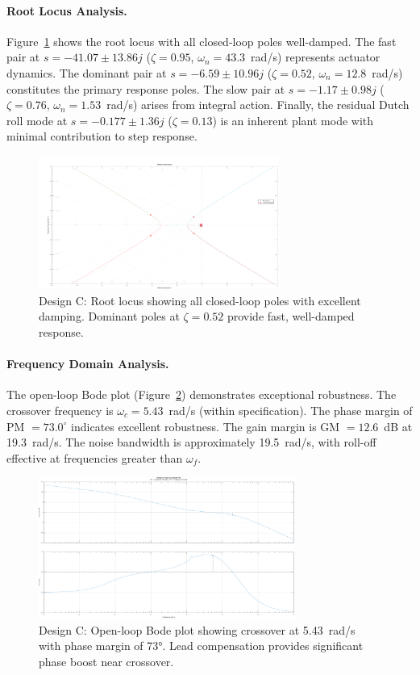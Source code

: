 \paragraph{Root Locus Analysis.}
Figure~\ref{fig:design_C_rlocus} shows the root locus with all closed-loop poles well-damped. The fast pair at $s = -41.07 \pm 13.86j$ ($\zeta=0.95$, $\omega_n=43.3$~rad/s) represents actuator dynamics. The dominant pair at $s = -6.59 \pm 10.96j$ ($\zeta=0.52$, $\omega_n=12.8$~rad/s) constitutes the primary response poles. The slow pair at $s = -1.17 \pm 0.98j$ ($\zeta=0.76$, $\omega_n=1.53$~rad/s) arises from integral action. Finally, the residual Dutch roll mode at $s = -0.177 \pm 1.36j$ ($\zeta=0.13$) is an inherent plant mode with minimal contribution to step response.

\begin{figure}[h!]
\centering
\includegraphics[width=0.7\textwidth]{../MATLAB/LaTeX_Exports/design_C_root_locus.pdf}
\caption{Design C: Root locus showing all closed-loop poles with excellent damping. Dominant poles at $\zeta=0.52$ provide fast, well-damped response.}
\label{fig:design_C_rlocus}
\end{figure}

\paragraph{Frequency Domain Analysis.}
The open-loop Bode plot (Figure~\ref{fig:design_C_bode}) demonstrates exceptional robustness. The crossover frequency is $\omega_c = 5.43$~rad/s (within specification). The phase margin of PM $= 73.0^\circ$ indicates excellent robustness. The gain margin is GM $= 12.6$~dB at 19.3~rad/s. The noise bandwidth is approximately 19.5~rad/s, with roll-off effective at frequencies greater than $\omega_f$.

\begin{figure}[h!]
\centering
\includegraphics[width=0.75\textwidth]{../MATLAB/LaTeX_Exports/design_C_bode.pdf}
\caption{Design C: Open-loop Bode plot showing crossover at 5.43~rad/s with phase margin of 73°. Lead compensation provides significant phase boost near crossover.}
\label{fig:design_C_bode}
\end{figure}


